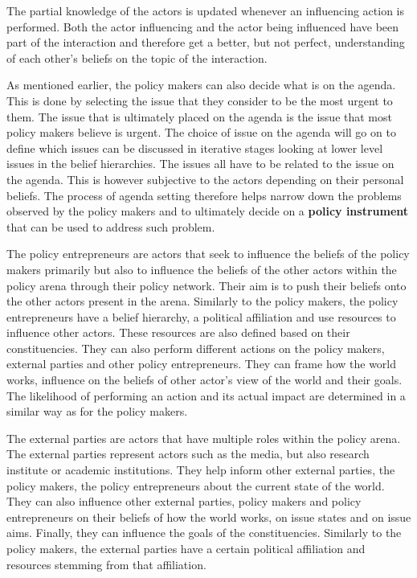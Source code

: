 The partial knowledge of the actors is updated whenever an influencing action is performed. Both the actor influencing and the actor being influenced have been part of the interaction and therefore get a better, but not perfect, understanding of each other’s beliefs on the topic of the interaction.

As mentioned earlier, the policy makers can also decide what is on the agenda. This is done by selecting the issue that they consider to be the most urgent to them. The issue that is ultimately placed on the agenda is the issue that most policy makers believe is urgent. The choice of issue on the agenda will go on to define which issues can be discussed in iterative stages looking at lower level issues in the belief hierarchies. The issues all have to be related to the issue on the agenda. This is however subjective to the actors depending on their personal beliefs. The process of agenda setting therefore helps narrow down the problems observed by the policy makers and to ultimately decide on a {\bfseries policy instrument} that can be used to address such problem.

The policy entrepreneurs are actors that seek to influence the beliefs of the policy makers primarily but also to influence the beliefs of the other actors within the policy arena through their policy network. Their aim is to push their beliefs onto the other actors present in the arena. Similarly to the policy makers, the policy entrepreneurs have a belief hierarchy, a political affiliation and use resources to influence other actors. These resources are also defined based on their constituencies. They can also perform different actions on the policy makers, external parties and other policy entrepreneurs. They can frame how the world works, influence on the beliefs of other actor’s view of the world and their goals. The likelihood of performing an action and its actual impact are determined in a similar way as for the policy makers.

The external parties are actors that have multiple roles within the policy arena. The external parties represent actors such as the media, but also research institute or academic institutions. They help inform other external parties, the policy makers, the policy entrepreneurs about the current state of the world. They can also influence other external parties, policy makers and policy entrepreneurs on their beliefs of how the world works, on issue states and on issue aims. Finally, they can influence the goals of the constituencies. Similarly to the policy makers, the external parties have a certain political affiliation and resources stemming from that affiliation.

